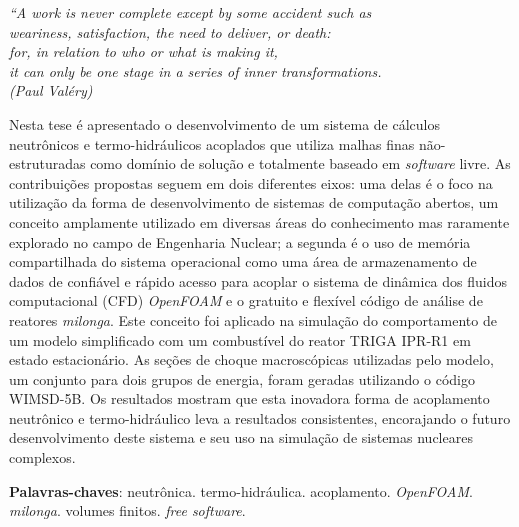 \documentclass[12pt,openright,twoside,a4paper,english,french,spanish,brazil]{abntex2}
\begin{document}
\begin{epigrafe}
    \vspace*{\fill}
	\begin{flushright}
          \textit{``A work is never complete except by some accident such as\\
            weariness, satisfaction, the need to deliver, or death: \\
            for, in relation to who or what is making it, \\
            it can only be one stage in a series of inner transformations. \\
            (Paul Valéry)}
	\end{flushright}
\end{epigrafe}


\begin{resumo}

  Nesta tese é apresentado o desenvolvimento de um sistema de cálculos
  neutrônicos e termo-hidráulicos acoplados que utiliza malhas finas não-estruturadas
  como domínio de solução e totalmente baseado em \textit{software} livre.
  As contribuições propostas seguem em dois diferentes eixos: uma delas é o foco na utilização
  da forma de desenvolvimento de sistemas de computação abertos, um conceito amplamente
  utilizado em diversas áreas do conhecimento mas raramente explorado no campo de Engenharia Nuclear;
  a segunda é o uso de memória compartilhada do sistema operacional como uma área de armazenamento
  de dados de confiável e rápido acesso para acoplar o sistema de dinâmica dos fluidos computacional
  (CFD) \textit{OpenFOAM} e o gratuito e flexível código de análise de reatores \textit{milonga}.
  Este conceito foi aplicado na simulação do comportamento de um modelo simplificado com um combustível
  do reator TRIGA IPR-R1 em estado estacionário. As seções de choque macroscópicas utilizadas pelo
  modelo, um conjunto para dois grupos de energia, foram geradas utilizando o código WIMSD-5B.
  Os resultados mostram que esta inovadora forma de acoplamento neutrônico e termo-hidráulico leva
  a resultados consistentes,
  encorajando o futuro desenvolvimento deste sistema e seu uso na simulação de sistemas nucleares complexos.


 \vspace{\onelineskip}
    
 \noindent
 \textbf{Palavras-chaves}: neutrônica. termo-hidráulica. acoplamento. \textit{OpenFOAM}. \textit{milonga}. volumes finitos. \textit{free software}.
\end{resumo}
\end{document}
